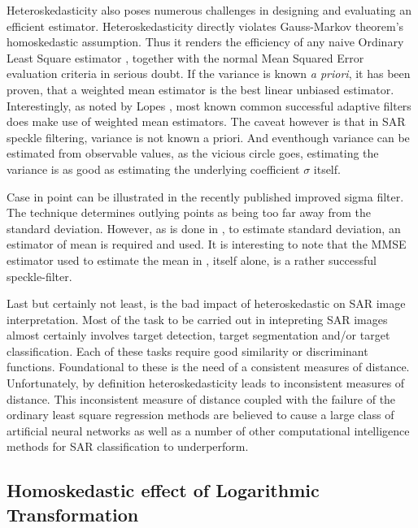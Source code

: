 \documentclass[journal]{IEEEtran}
\begin{document}
Heteroskedasticity also poses numerous challenges in designing and evaluating an efficient estimator. 
Heteroskedasticity directly violates Gauss-Markov theorem's homoskedastic assumption. 
Thus it renders the efficiency of any naive Ordinary Least Square estimator \cite{Furno_1991_JStatCompSimul}, together with the normal Mean Squared Error evaluation criteria in serious doubt. 
If the variance is known \textit{a priori}, it has been proven, that a weighted mean estimator is the best linear unbiased estimator. 
Interestingly, as noted by Lopes \cite{Lopes_TGRS_1990}, most known common successful adaptive filters \cite{Lee_PAMI_1980} \cite{Kuan_1985_PAMI} \cite{Frost_PAMI_1982} does make use of weighted mean estimators. 
The caveat however is that in SAR speckle filtering, variance is not known a priori. 
And eventhough variance can be estimated from observable values, as the vicious circle goes, estimating the variance is as good as estimating the underlying coefficient $\sigma$ itself.

Case in point can be illustrated in the recently published improved sigma filter\cite{Lee_TGRS_2009}. 
The technique determines outlying points as being too far away from the standard deviation. 
However, as is done in \cite{Lee_TGRS_2009}, to estimate standard deviation, an estimator of mean is required and used. 
It is interesting to note that the MMSE estimator used to estimate the mean in \cite{Lee_TGRS_2009}, itself alone, is a rather successful speckle-filter\cite{Lee_PAMI_1980}.

Last but certainly not least, is the bad impact of heteroskedastic on SAR image interpretation. 
Most of the task to be carried out in intepreting SAR images almost certainly involves target detection, target segmentation and/or target classification. 
Each of these tasks require good similarity or discriminant functions. 
Foundational to these is the need of a consistent measures of distance. 
Unfortunately, by definition heteroskedasticity leads to inconsistent measures of distance. 
This inconsistent measure of distance coupled with the failure of the ordinary least square regression methods are believed to cause a large class of artificial neural networks as well as a number of other computational intelligence methods for SAR classification to underperform.

\subsection{ Homoskedastic effect of Logarithmic Transformation }
\end{document}
